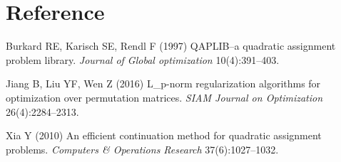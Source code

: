 \documentclass[
  10pt,
  a4paper,
,tablecaptionabove
]{scrartcl}
\newlength{\cslhangindent}
\newenvironment{cslreferences}%
  {\setlength{\parindent}{0pt}%
  \everypar{\setlength{\hangindent}{\cslhangindent}}\ignorespaces}%
  {\par}
\begin{document}
\hypertarget{reference}{%
\section*{Reference}\label{reference}}

\hypertarget{refs}{}
\begin{cslreferences}
\leavevmode\hypertarget{ref-burkard1997qaplib}{}%
Burkard RE, Karisch SE, Rendl F (1997) QAPLIB--a quadratic assignment
problem library. \emph{Journal of Global optimization} 10(4):391--403.

\leavevmode\hypertarget{ref-jiang_l_p-norm_2016}{}%
Jiang B, Liu YF, Wen Z (2016) L\_p-norm regularization algorithms for
optimization over permutation matrices. \emph{SIAM Journal on
Optimization} 26(4):2284--2313.

\leavevmode\hypertarget{ref-xia_efficient_2010}{}%
Xia Y (2010) An efficient continuation method for quadratic assignment
problems. \emph{Computers \& Operations Research} 37(6):1027--1032.
\end{cslreferences}
\end{document}
